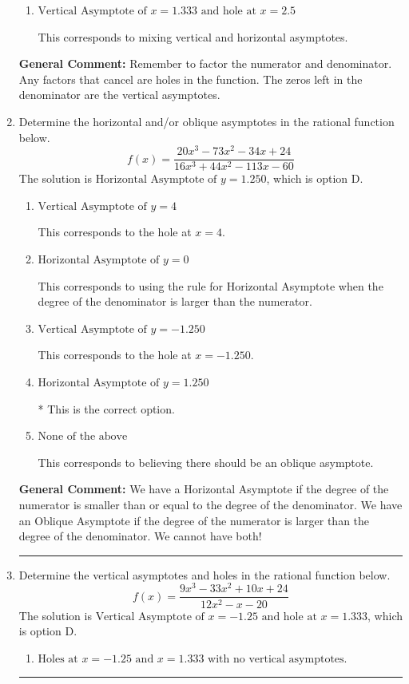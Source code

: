 \documentclass{extbook}[14pt]
\newcommand{\litem}[1]{\item #1

\rule{\textwidth}{0.4pt}}
\begin{document}
\begin{enumerate}
{\begin{enumerate}[label=\Alph*.]
This is the correct answer.
\item \( \text{Vertical Asymptote of } x = 1.333 \text{ and hole at } x = 2.5 \)

This corresponds to mixing vertical and horizontal asymptotes.
\end{enumerate}

\textbf{General Comment:} Remember to factor the numerator and denominator. Any factors that cancel are holes in the function. The zeros left in the denominator are the vertical asymptotes.
}
\litem{
Determine the horizontal and/or oblique asymptotes in the rational function below.
\[ f(x) = \frac{20x^{3} -73 x^{2} -34 x + 24}{16x^{3} +44 x^{2} -113 x -60} \]The solution is \( \text{Horizontal Asymptote of } y = 1.250  \), which is option D.\begin{enumerate}[label=\Alph*.]
\item \( \text{Vertical Asymptote of } y = 4  \)

This corresponds to the hole at $x = 4$.
\item \( \text{Horizontal Asymptote of } y = 0  \)

This corresponds to using the rule for Horizontal Asymptote when the degree of the denominator is larger than the numerator.
\item \( \text{Vertical Asymptote of } y = -1.250  \)

This corresponds to the hole at $x = -1.250$.
\item \( \text{Horizontal Asymptote of } y = 1.250  \)

* This is the correct option.
\item \( \text{None of the above} \)

This corresponds to believing there should be an oblique asymptote.
\end{enumerate}

\textbf{General Comment:} We have a Horizontal Asymptote if the degree of the numerator is smaller than or equal to the degree of the denominator. We have an Oblique Asymptote if the degree of the numerator is larger than the degree of the denominator. We cannot have both!
}
\litem{
Determine the vertical asymptotes and holes in the rational function below.
\[ f(x) = \frac{9x^{3} -33 x^{2} +10 x + 24}{12x^{2} -x -20} \]The solution is \( \text{Vertical Asymptote of } x = -1.25 \text{ and hole at } x = 1.333 \), which is option D.\begin{enumerate}[label=\Alph*.]
\item \( \text{Holes at } x = -1.25 \text{ and } x = 1.333 \text{ with no vertical asymptotes.} \)


\end{enumerate}}
\end{enumerate}
\end{document}

